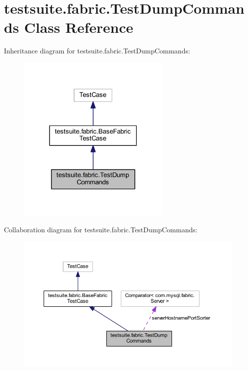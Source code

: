 \hypertarget{classtestsuite_1_1fabric_1_1_test_dump_commands}{}\section{testsuite.\+fabric.\+Test\+Dump\+Commands Class Reference}
\label{classtestsuite_1_1fabric_1_1_test_dump_commands}


Inheritance diagram for testsuite.\+fabric.\+Test\+Dump\+Commands\+:
\nopagebreak
\begin{figure}[H]
\begin{center}
\leavevmode
\includegraphics[width=213pt]{classtestsuite_1_1fabric_1_1_test_dump_commands__inherit__graph}
\end{center}
\end{figure}


Collaboration diagram for testsuite.\+fabric.\+Test\+Dump\+Commands\+:
\nopagebreak
\begin{figure}[H]
\begin{center}
\leavevmode
\includegraphics[width=350pt]{classtestsuite_1_1fabric_1_1_test_dump_commands__coll__graph}
\end{center}
\end{figure}
